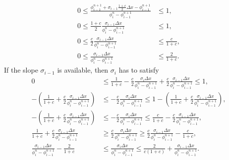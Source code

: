 \documentclass[../thesis.tex]{subfiles}
\begin{document}
\begin{equation}
    \label{eqn:slope-bounds}
    \begin{split}
        0
        \leq
        \frac{\phi_{i-1}^{n+1}
        +\sigma_{i-1}\frac{1+c}{2}\Delta x
        - \phi_{i-1}^{n+1}}{\phi_{i}^{n} - \phi_{i-1}^{n+1}}
        &\leq
        1,
        \\
        0
        \leq
        \frac{1+c}{2}
        \frac{\sigma_{i-1}\Delta x}
        {\phi_{i}^{n} - \phi_{i-1}^{n+1}}
        &\leq
        1,
        \\
        0
        \leq
        \frac{c}{2}
        \frac{\sigma_{i-1}\Delta x}
        {\phi_{i}^{n} - \phi_{i-1}^{n+1}}
        &\leq
        \frac{c}{1+c},
        \\
        0
        \leq
        \frac{\sigma_{i-1}\Delta x}
        {\phi_{i}^{n} - \phi_{i-1}^{n+1}}
        &\leq
        \frac{2}{1+c}.
    \end{split}
\end{equation}
If the slope \(\sigma_{i-1}\) is available, then
\(\sigma_{i}\) has to satisfy
\begin{equation}
    \label{eqn:slope-necessary}
    \begin{split}
        0
        &\leq
        \frac{1}{1+c}
        -\frac{c}{2}
        \frac{\sigma_{i}\Delta x}
        {\phi_{i}^{n} - \phi_{i-1}^{n+1}}
        +\frac{c}{2}
        \frac{\sigma_{i-1}\Delta x}
        {\phi_{i}^{n} - \phi_{i-1}^{n+1}}
        \leq
        1,
        \\
        -\left(\frac{1}{1+c}
        + \frac{c}{2}
        \frac{\sigma_{i-1}\Delta x}
        {\phi_{i}^{n} - \phi_{i-1}^{n+1}}\right)
        &\leq
        -\frac{c}{2}
        \frac{\sigma_{i}\Delta x}
        {\phi_{i}^{n} - \phi_{i-1}^{n+1}}
        \leq
        1-\left(\frac{1}{1+c}
        + \frac{c}{2}
        \frac{\sigma_{i-1}\Delta x}
        {\phi_{i}^{n} - \phi_{i-1}^{n+1}}\right),
        \\
        -\left(\frac{1}{1+c}
        + \frac{c}{2}
        \frac{\sigma_{i-1}\Delta x}
        {\phi_{i}^{n} - \phi_{i-1}^{n+1}}\right)
        &\leq
        -\frac{c}{2}
        \frac{\sigma_{i}\Delta x}
        {\phi_{i}^{n} - \phi_{i-1}^{n+1}}
        \leq
        \frac{c}{1+c}
        - \frac{c}{2}
        \frac{\sigma_{i-1}\Delta x}
        {\phi_{i}^{n} - \phi_{i-1}^{n+1}},
        \\
        \frac{1}{1+c}
        + \frac{c}{2}
        \frac{\sigma_{i-1}\Delta x}
        {\phi_{i}^{n} - \phi_{i-1}^{n+1}}
        &\geq
        \frac{c}{2}
        \frac{\sigma_{i}\Delta x}
        {\phi_{i}^{n} - \phi_{i-1}^{n+1}}
        \geq
        \frac{c}{2}
        \frac{\sigma_{i-1}\Delta x}
        {\phi_{i}^{n} - \phi_{i-1}^{n+1}}
        -\frac{c}{1+c},
        \\
        \frac{\sigma_{i-1}\Delta x}
        {\phi_{i}^{n} - \phi_{i-1}^{n+1}}
        -\frac{2}{1+c}
        &\leq
        \frac{\sigma_{i}\Delta x}
        {\phi_{i}^{n} - \phi_{i-1}^{n+1}}
        \leq
        \frac{2}{c(1+c)}
        + \frac{\sigma_{i-1}\Delta x}
        {\phi_{i}^{n} - \phi_{i-1}^{n+1}}.
    \end{split}
\end{equation}
\end{document}
